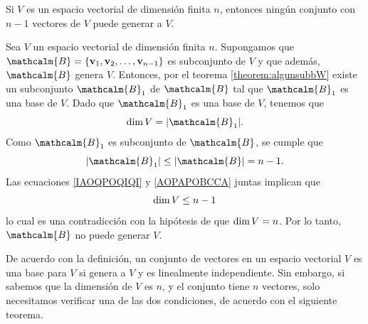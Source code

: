 \newpage

\begin{theorem}{}{}
    Si $V$ es un espacio vectorial de dimensión finita $n$, entonces ningún conjunto con $n - 1$ vectores de $V$ puede generar a $V$.

    \tcblower
    \demostracion Sea $V$ un espacio vectorial de dimensión finita $n$. Supongamos que $\mathcalm{B} = \{\mathbf{v}_1, \mathbf{v}_2, \dots, \mathbf{v}_{n-1}\}$ es subconjunto de $V$ y que además, $\mathcalm{B}$ genera $V$. Entonces, por el teorema \ref{theorem:algunsubbW} existe un subconjunto $\mathcalm{B}_1$ de $\mathcalm{B}$ tal que $\mathcalm{B}_1$ es una base de $V$. Dado que $\mathcalm{B}_1$ es una base de $V$, tenemos que
    \begin{equation}
        \Dim V = |\mathcalm{B}_1|. \label{IAOQPOQIQI}
    \end{equation}
    Como $\mathcalm{B}_1$ es subconjunto de $\mathcalm{B}$, se cumple que
    \begin{equation}
        |\mathcalm{B}_1| \leq |\mathcalm{B}| = n - 1. \label{AOPAPOBCCA}
    \end{equation}
    Las ecuaciones \eqref{IAOQPOQIQI} y \eqref{AOPAPOBCCA} juntas implican que
    $$\operatorname{dim} V \leq n - 1 $$
    lo cual es una contradicción con la hipótesis de que $\operatorname{dim} V = n$. Por lo tanto, $\mathcalm{B}$ no puede generar $V$.
\end{theorem}

De acuerdo con la definición, un conjunto de vectores en un espacio vectorial $V$ es una base para $V$ si genera a $V$ y es linealmente independiente. Sin embargo, si sabemos que la dimensión de $V$ es $n$, y el conjunto tiene $n$ vectores, solo necesitamos verificar una de las dos condiciones, de acuerdo con el siguiente teorema.


